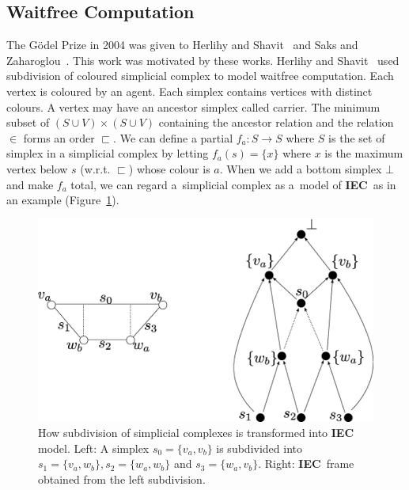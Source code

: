 \documentclass[doctor]{iscs-thesis}
\newcommand{\iec}{{\rm {\textbf{IEC}}}}
\begin{document}
\subsection{Waitfree Computation}
\label{Shavit}
The G\"{o}del Prize in 2004 was given to Herlihy and Shavit~\cite{herlihy1999topological}
and
Saks and Zaharoglou~\cite{saks2000wait}.
This work was motivated by these works.
Herlihy and Shavit~\cite{herlihy1999topological} used
 subdivision of coloured simplicial complex to model
waitfree computation. Each vertex is coloured by an agent. Each simplex contains vertices
with distinct colours. A vertex may have an ancestor simplex called carrier.
The minimum subset of $(S\cup V) \times (S\cup V)$
 containing the ancestor relation and the relation $\in$ forms an order $\sqsubset$.
We can define a partial
 $f_a: S\rightarrow S$ where $S$ is the set of simplex in
a simplicial complex by letting $f_a(s) = \{x\}$ where $x$ is the maximum vertex below $s$
(w.r.t. $\sqsubset$)
 whose colour is
$a$. When we add a bottom simplex $\bot$ and make $f_a$ total, we can regard
a~simplicial complex as a~model of \iec\, as in an example (Figure~\ref{subdivision}).
\begin{figure}
 \begin{center}
  \includegraphics[scale=0.3]{subdivision_original.eps}
 \end{center}
 \caption[How subdivision of simplicial complexes is transformed into
 \iec\, model.]
{How subdivision of simplicial complexes is transformed into \iec\, model.
Left: A simplex $s_0 = \{v_a, v_b\}$ is subdivided into $s_1 = \{v_a, w_b\}, s_2
 = \{w_a, w_b\}$ and $s_3 = \{w_a, v_b\}$. Right: \iec\, frame obtained from the left
 subdivision.}
\label{subdivision}
\end{figure}
\end{document}
